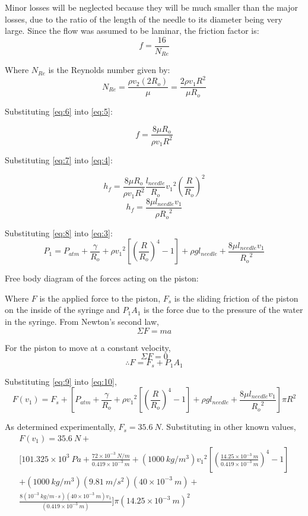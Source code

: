 \documentclass{article}
\begin{document}
Minor losses will be neglected because they will be much smaller than the major losses, due to the ratio of the length of the needle to its diameter being very large. Since the flow was assumed to be laminar, the friction factor is:
\[ f = \frac{16}{N_{Re}} \tag{5} \label{eq:5} \]

Where $N_{Re}$ is the Reynolds number given by:
\[ N_{Re} = \frac{\rho v_{2} (2R_{o})}{\mu} = \frac{2 \rho v_{1} R^{2}}{\mu R_{o}} \tag{6} \label{eq:6} \]

Substituting \eqref{eq:6} into \eqref{eq:5}:

\[ f = \frac{8 \mu R_{o}}{\rho v_{1} R^{2}} \tag{7} \label{eq:7} \]

Substituting \eqref{eq:7} into \eqref{eq:4}:

\[ h_{f} = \frac{8 \mu R_{o}}{\rho v_{1} R^{2}} \frac{l_{needle}}{R_{o}} {v_{1}}^2 \left(\frac{R}{R_{o}}\right)^2 \]
\[ h_{f} = \frac{8 \mu l_{needle} v_{1} }{\rho {R_{o}}^2} \tag{8} \label{eq:8} \]

Substituting \eqref{eq:8} into \eqref{eq:3}:
\[ P_{1} = P_{atm} + \frac{\gamma}{R_{o}} + \rho{v_{1}}^2\left[\left(\frac{R}{R_{o}}\right)^4  - 1 \right] + \rho gl_{needle} + \frac{8 \mu l_{needle} v_{1} }{{R_{o}}^2} \tag{9} \label{eq:9} \]

Free body diagram of the forces acting on the piston:

Where $F$ is the applied force to the piston, $F_{s}$ is the sliding friction of the piston on the inside of the syringe and $P_{1}A_{1}$ is the force due to the pressure of the water in the syringe. From Newton's second law,
\[ \Sigma F = ma \]

For the piston to move at a constant velocity,
\[ \Sigma F = 0 \]
\[ \therefore F = F_{s} + P_{1}A_{1} \tag{10} \label{eq:10} \]

Substituting \eqref{eq:9} into \eqref{eq:10},
\[ F(v_{1}) = F_{s} + \left[P_{atm} + \frac{\gamma}{R_{o}} + \rho{v_{1}}^2\left[\left(\frac{R}{R_{o}}\right)^4  - 1 \right] + \rho gl_{needle} + \frac{8 \mu l_{needle} v_{1} }{{R_{o}}^2} \right] \pi R^{2}\]

As determined experimentally, $F_{s} = 35.6 \ N$. Substituting in other known values,
\begin{multline*}
F(v_{1}) = 35.6 \ N + \\ \bigg[ 101.325 \times 10^{3} \ Pa + \frac{72 \times 10^{-3} \ N/m}{0.419 \times 10^{-3} \ m} +\left(1000 \ kg/m^3 \right) {v_{1}}^2 \left[\left(\frac{14.25 \times 10^{-3} \ m}{0.419 \times 10^{-3} \ m}\right)^4  - 1 \right] \\ + \left(1000 \ kg/m^3 \right) \left( 9.81 \ m/s^2 \right) \left( 40 \times 10^{-3} \ m \right) + \\ \frac{8 \left( 10^{-3} \ kg/m \cdot s \right) \left( 40 \times 10^{-3} \ m \right) v_{1}}{\left( 0.419 \times 10^{-3} \ m \right)} \bigg] \pi {\left( 14.25 \times 10^{-3} \ m \right)}^{2}
\end{multline*}
\end{document}
